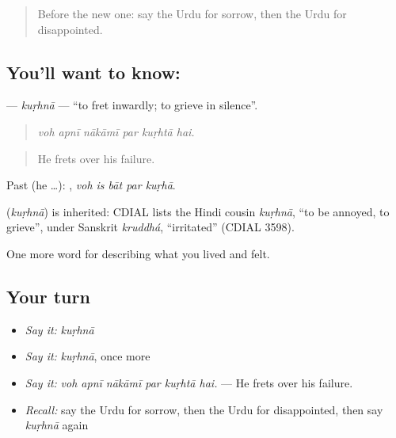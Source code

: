 \label{lesson:UR-C443-kurhna}



\begin{quote}
Before the new one: say the Urdu for sorrow, then the Urdu for disappointed.
\end{quote}

\subsection*{You'll want to know: }
\textbf{} — \emph{kuṛhnā} — \textquotedblleft{}to fret inwardly; to grieve in silence\textquotedblright{}.

\begin{quote}
     
\end{quote}

\begin{quote}
\emph{voh apnī nākāmī par kuṛhtā hai.}
\end{quote}

\begin{quote}
He frets over his failure.
\end{quote}

Past (he …):     , \emph{voh is bāt par kuṛhā}.

\begin{cousinweb}
\textbf{} (\emph{kuṛhnā}) is inherited: CDIAL lists the Hindi cousin \emph{kuṛhnā}, \textquotedblleft{}to be annoyed, to grieve\textquotedblright{}, under Sanskrit \emph{kruddhá}, \textquotedblleft{}irritated\textquotedblright{} (CDIAL 3598).
\end{cousinweb}

\begin{grammarlens}[title={What you've built}]
One more word for describing what you lived and felt.
\end{grammarlens}

\subsection*{Your turn}
\begin{itemize}
\raggedright
  \item \emph{Say it:} \emph{kuṛhnā}
  \item \emph{Say it:} \emph{kuṛhnā}, once more
  \item \emph{Say it:} \emph{voh apnī nākāmī par kuṛhtā hai.} — He frets over his failure.
  \item \emph{Recall:} say the Urdu for sorrow, then the Urdu for disappointed, then say \emph{kuṛhnā} again
\end{itemize}

